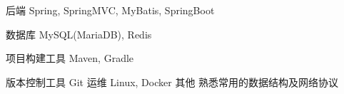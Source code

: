 

\begin{cvskills}

  \cvskill
    {后端} %
    {Spring, SpringMVC, MyBatis, SpringBoot} %

  \cvskill
    {数据库} %
	{MySQL(MariaDB), Redis} %

  \cvskill
    {项目构建工具} %
    {Maven, Gradle} %

  \cvskill
    {版本控制工具} %
    {Git} %
   \cvskill
    {运维} %
    {Linux, Docker } %
    \cvskill
    {其他} %
    {熟悉常用的数据结构及网络协议 } %
	

\end{cvskills}
